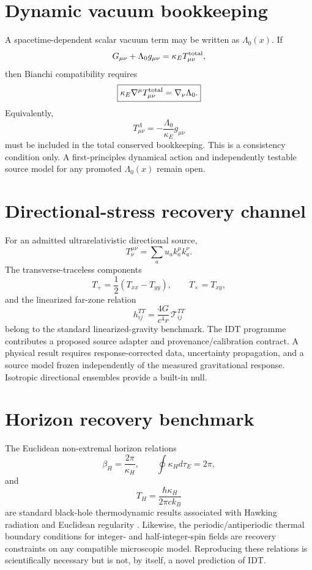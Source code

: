 \section{Dynamic vacuum bookkeeping}

A spacetime-dependent scalar vacuum term may be written as \(\Lambda_0(x)\). If
\[
G_{\mu\nu}+\Lambda_0g_{\mu\nu}
=
\kappa_E T^{\rm total}_{\mu\nu},
\]
then Bianchi compatibility requires
\[
\boxed{
\kappa_E\nabla^\mu T^{\rm total}_{\mu\nu}
=
\nabla_\nu\Lambda_0.
}
\]
Equivalently,
\[
T^\Lambda_{\mu\nu}
=-\frac{\Lambda_0}{\kappa_E}g_{\mu\nu}
\]
must be included in the total conserved bookkeeping. This is a consistency condition only. A first-principles dynamical action and independently testable source model for any promoted \(\Lambda_0(x)\) remain open.

\section{Directional-stress recovery channel}

For an admitted ultrarelativistic directional source,
\[
T_\nu^{\mu\nu}
=
\sum_a u_a k_a^\mu k_a^\nu.
\]
The transverse-traceless components
\[
T_+=\frac12(T_{xx}-T_{yy}),
\qquad
T_\times=T_{xy},
\]
and the linearized far-zone relation
\[
\boxed{
h_{ij}^{TT}
=
\frac{4G}{c^4r}\,\mathcal T_{ij}^{TT}
}
\]
belong to the standard linearized-gravity benchmark. The IDT programme contributes a proposed source adapter and provenance/calibration contract. A physical result requires response-corrected data, uncertainty propagation, and a source model frozen independently of the measured gravitational response. Isotropic directional ensembles provide a built-in null.

\section{Horizon recovery benchmark}

The Euclidean non-extremal horizon relations
\[
\beta_H=\frac{2\pi}{\kappa_H},
\qquad
\oint\kappa_Hd\tau_E=2\pi,
\]
and
\[
\boxed{
T_H=\frac{\hbar\kappa_H}{2\pi c k_B}
}
\]
are standard black-hole thermodynamic results associated with Hawking radiation and Euclidean regularity \cite{Hawking1975,GibbonsHawking1977}. Likewise, the periodic/antiperiodic thermal boundary conditions for integer- and half-integer-spin fields are recovery constraints on any compatible microscopic model. Reproducing these relations is scientifically necessary but is not, by itself, a novel prediction of IDT.

